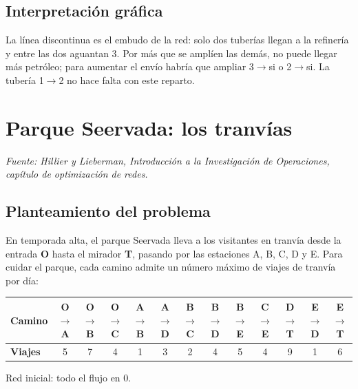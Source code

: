\documentclass[11pt,a4paper]{article}
\newcommand{\ar}[4][arco]{\draw[#1] (#2) to node[etq, lbl] {#4} (#3);}
\newcommand{\nodosSunco}{%
  \node[fuente]   (so) at (0,-1)   {so};
  \node[nodo]     (n1) at (1.4,0)  {1};
  \node[nodo]     (n2) at (1.4,-2) {2};
  \node[nodo]     (n3) at (2.8,0)  {3};
  \node[sumidero] (si) at (4.2,-1) {si};}
\newcommand{\nodosSeervada}{%
  \node[fuente]   (O) at (0,-2)     {O};
  \node[nodo]     (A) at (1.5,-0.6) {A};
  \node[nodo]     (B) at (2,-2)     {B};
  \node[nodo]     (C) at (1.5,-3.4) {C};
  \node[nodo]     (D) at (3.6,-0.9) {D};
  \node[nodo]     (E) at (3.6,-3.1) {E};
  \node[sumidero] (T) at (5,-2)     {T};}
\begin{document}
\subsection*{Interpretación gráfica}
\begin{center}
\end{center}
La línea discontinua es el embudo de la red: solo dos tuberías llegan a la refinería y entre las dos aguantan 3.
Por más que se amplíen las demás, no puede llegar más petróleo; para aumentar el envío habría que ampliar
3$\to$si o 2$\to$si. La tubería 1$\to$2 no hace falta con este reparto.

\newpage
\section{Parque Seervada: los tranvías}
\textit{Fuente: Hillier y Lieberman, Introducción a la Investigación de Operaciones, capítulo de optimización de redes.}

\subsection*{Planteamiento del problema}
En temporada alta, el parque Seervada lleva a los visitantes en tranvía desde la entrada \textbf{O} hasta el
mirador \textbf{T}, pasando por las estaciones A, B, C, D y E. Para cuidar el parque, cada camino admite un número
máximo de viajes de tranvía por día:

\begin{center}\small
\setlength{\tabcolsep}{4.5pt}
\begin{tabular}{lcccccccccccc}
\toprule
\textbf{Camino} & O$\to$A & O$\to$B & O$\to$C & A$\to$B & A$\to$D & B$\to$C & B$\to$D & B$\to$E & C$\to$E & D$\to$T & E$\to$D & E$\to$T \\
\midrule
\textbf{Viajes} & 5 & 7 & 4 & 1 & 3 & 2 & 4 & 5 & 4 & 9 & 1 & 6 \\
\bottomrule
\end{tabular}

\medskip
{}

Red inicial: todo el flujo en 0.
\end{center}
\end{document}
